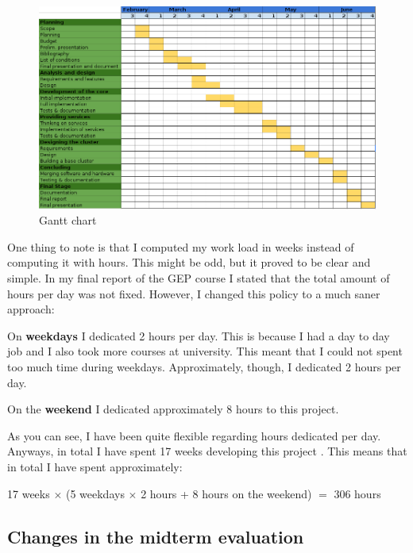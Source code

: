 \begin{figure}[H]
  \hspace*{-2cm}
  \includegraphics[scale=0.75]{development/images/gantt.png}
  \caption{Gantt chart}\label{fig:gantt}
\end{figure}

One thing to note is that I computed my work load in weeks instead of computing
it with hours. This might be odd, but it proved to be clear and simple. In my
final report of the \ac{GEP} course I stated that the total amount of hours per
day was not fixed. However, I changed this policy to a much saner approach:

\mylist
  \item On {\bf weekdays} I dedicated 2 hours per day. This is because I had a
day to day job and I also took more courses at university. This meant that I
could not spent too much time during weekdays. Approximately, though, I
dedicated 2 hours per day.
  \item On the {\bf weekend} I dedicated approximately 8 hours to this project.
\mylistend

As you can see, I have been quite flexible regarding hours dedicated per day.
Anyways, in total I have spent 17 weeks developing this project . This means
that in total I have spent approximately:

\begin{center}
  17 weeks $\times$ (5 weekdays $\times$ 2 hours + 8 hours on the
weekend) $=$ 306 hours
\end{center}

\subsection{Changes in the midterm evaluation}

